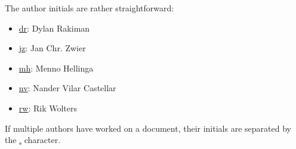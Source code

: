 \documentclass[a4paper, 10pt]{article}
\begin{document}
The author initials are rather straightforward:
\begin{itemize}
	\item \url{dr}: Dylan Rakiman
	\item \url{jz}: Jan Chr. Zwier
	\item \url{mh}: Menno Hellinga
	\item \url{nv}: Nander Vilar Castellar
	\item \url{rw}: Rik Wolters
\end{itemize}

If multiple authors have worked on a document, their initials are separated by
the \url{.} character.
\end{document}
